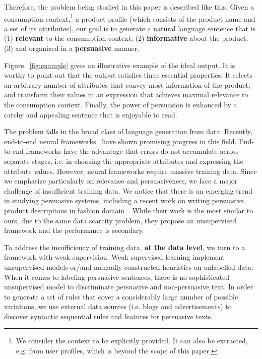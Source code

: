 \documentclass[sigconf]{acmart}
\begin{document}
Therefore, the problem being studied in this paper is described like this.
Given a  consumption context,\footnote{We consider the context to be explicitly provided. It can also be extracted, e.g. from user profiles, which is beyond the scope of this paper.}
a product profile (which consists of the product name and a set of its attributes), 
our goal is to generate a natural language sentence that is 
(1) \textbf{relevant} to the consumption context, (2) \textbf{informative} about the product, (3) and organized in a \textbf{persuasive} manner.

Figure.~\ref{fig:example} gives an illustrative example of the ideal output.
It is worthy to point out that the output satisfies three essential properties. 
It selects an arbitrary number of attributes that convey most information of the product,
and transform their values in an expression that achieves maximal relevance to the consumption context. 
Finally, the power of persuasion is enhanced by a catchy and appealing sentence that is enjoyable to read.

The problem falls in the broad class of language generation from data. Recently, end-to-end neural frameworks~\cite{Wiseman2017Challenges,Yang2017Reference,Lebret2016Neural,Karpathy2015Deep} have shown promising progress in this field. End-to-end frameworks have the advantage that errors do not accumulate across separate stages, i.e. in choosing the appropriate attributes and expressing the attribute values. However, neural frameworks require massive training data. Since we emphasize particularly on relevance and persuasiveness, we face a major challenge of  insufficient training data. We notice that there is an emerging trend in studying persuasive systems, including a recent work on writing persuasive product descriptions in fashion domain~\cite{munigala2018persuaide}. While their work is the most similar to ours, due to the same data scarcity problem, they propose an unsupervised framework and the performance is secondary.

To address the insufficiency of training data, \textbf{at the data level}, we turn to a framework with weak supervision. 
Weak supervised learning implement unsupervised models or/and manually constructed heuristics on unlabelled data.
When it comes to labeling persuasive sentences, there is no sophisticated  unsupervised model to discriminate persuasive and non-persuasive text. 
In order to generate a set of rules that cover a considerably large number of possible variations, we use external data sources (i.e. blogs and advertisements) to discover syntactic sequential rules and features for persuasive texts.
\end{document}
